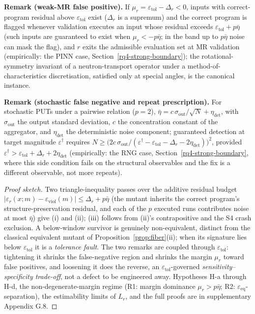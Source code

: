 \documentclass[manuscript,screen,review]{acmart}
\begin{document}
\textbf{Remark (weak-MR false positive).} If
$\mu_r = \varepsilon_{\mathrm{tol}} - \Delta_r < 0$, inputs with
correct-program residual above $\varepsilon_{\mathrm{tol}}$ exist
($\Delta_r$ is a supremum) and the correct program is flagged whenever
validation executes an input whose residual exceeds
$\varepsilon_{\mathrm{tol}} + p\bar\eta$ (such inputs are guaranteed to
exist when $\mu_r < -p\bar\eta$; in the band up to $p\bar\eta$ noise can
mask the flag), and $r$ exits the admissible evaluation set at MR
validation (empirically: the PINN case,
Section~\ref{rq4-strong-boundary}); the rotational-symmetry invariant of
a neutron-transport operator under a method-of-characteristics
discretisation, satisfied only at special angles, is the canonical
instance.

\textbf{Remark (stochastic false negative and repeat prescription).} For
stochastic PUTs under a pairwise relation ($p = 2$),
$\bar\eta = c\,\sigma_{\mathrm{out}}/\sqrt{N} + \eta_{\mathrm{det}}$,
with $\sigma_{\mathrm{out}}$ the output standard deviation, $c$ the
concentration constant of the aggregator, and $\eta_{\mathrm{det}}$ the
deterministic noise component; guaranteed detection at target magnitude
$\varepsilon^\dagger$ requires
$N \geq \bigl(2c\,\sigma_{\mathrm{out}}/(\varepsilon^\dagger - \varepsilon_{\mathrm{tol}} - \Delta_r - 2\eta_{\mathrm{det}})\bigr)^2$,
provided
$\varepsilon^\dagger > \varepsilon_{\mathrm{tol}} + \Delta_r + 2\eta_{\mathrm{det}}$
(empirically: the RNG case, Section~\ref{rq4-strong-boundary}, where
this side condition fails on the structural observables and the fix is a
different observable, not more repeats).

\begin{proof}[Proof sketch]
Two triangle-inequality passes over the additive residual budget
$|\varepsilon_r(x; m) - \varepsilon_{\mathrm{viol}}(m)| \leq \Delta_r + p\bar\eta$
(the mutant inherits the correct program's structure-preservation
residual, and each of the $p$ executed runs contributes noise at most
$\bar\eta$) give (i) and (ii); (iii) follows from (ii)'s contrapositive
and the S4 crash exclusion. A below-window survivor is genuinely
non-equivalent, distinct from the classical equivalent mutant of
Proposition~\ref{prop:fiber}(ii); when its signature lies below
$\varepsilon_{\mathrm{tol}}$ it is a \emph{tolerance fault}. The two
remarks are coupled through $\varepsilon_{\mathrm{tol}}$: tightening it
shrinks the false-negative region and shrinks the margin $\mu_r$ toward
false positives, and loosening it does the reverse, an
$\varepsilon_{\mathrm{tol}}$-governed
\emph{sensitivity--specificity trade-off}, not a defect to be engineered
away. Hypotheses H-a through H-d, the non-degenerate-margin regime (R1:
margin dominance $\mu_r > p\bar\eta$; R2:
$\varepsilon_{\mathrm{eq}}$-separation), the estimability limits of
$L_r$, and the full proofs are in supplementary Appendix G.8.
\end{proof}
\end{document}
